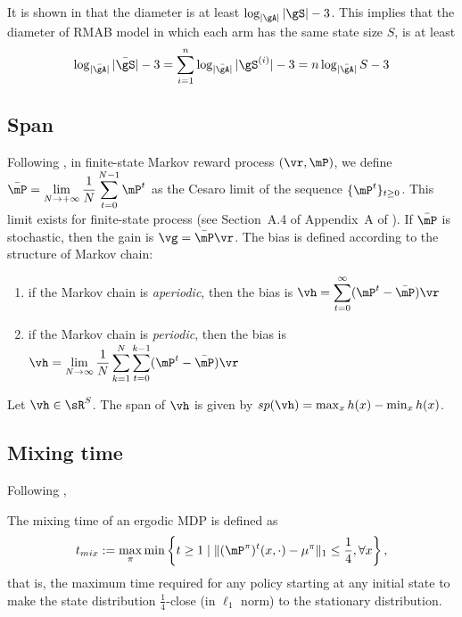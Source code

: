 It is shown in \cite[Appendix A]{jaksch2010near} that the diameter is at least $\log_{|\gA|}|\gS|-3$.
This implies that the diameter of RMAB model in which each arm has the same state size $S$, is at least
\begin{equation*}
    \log_{|\bar{\gA}|}|\bar{\gS}| -3 = \sum_{i=1}^{n}\log_{|\bar{\gA}|}|\gS^{(i)}| -3 =n\log_{|\bar{\gA}|}S -3
\end{equation*}

\subsection{Span}


Following \cite[Chapter~8]{puterman2014markov}, in finite-state Markov reward process $(\vr, \mP)$, we define $\bar{\mP}=\displaystyle\lim_{N\to+\infty}\frac1N\sum_{t=0}^{N-1}\mP^{t}$ as the Cesaro limit of the sequence $\{\mP^t\}_{t\ge0}$.
This limit exists for finite-state process (see Section~A.4 of Appendix~A of \cite{puterman2014markov}).
If $\bar{\mP}$ is stochastic, then the gain is $\vg=\bar{\mP}\vr$.
The bias is defined according to the structure of Markov chain:
\begin{enumerate}
    \item if the Markov chain is \emph{aperiodic}, then the bias is $\vh=\displaystyle\sum_{t=0}^\infty(\mP^t-\bar{\mP})\vr$
    \item if the Markov chain is \emph{periodic}, then the bias is $\vh=\displaystyle\lim_{N\to\infty}\frac1N\sum_{k=1}^N\sum_{t=0}^{k-1}(\mP^t-\bar{\mP})\vr$
\end{enumerate}

Let $\vh\in\sR^S$. The span of $\vh$ is given by $sp(\vh)=\max_xh(x) - \min_xh(x)$.

\subsection{Mixing time}

Following \cite[Definition 5.1]{wei2020model},
\begin{defn}
    \label{ch:restless:defn:mixing_time}
    The mixing time of an ergodic MDP is defined as
    \begin{align*}
        t_{mix} := \max_{\pi}\min\left\{ t\ge1 \mid \lVert (\mP^\pi)^t(x,\cdot) - \mu^\pi\rVert_1 \le \frac14, \forall x\right\},
    \end{align*}
    that is, the maximum time required for any policy starting at any initial state to make the state distribution $\frac14$-close (in $\ell_1$ norm) to the stationary distribution.
\end{defn}

